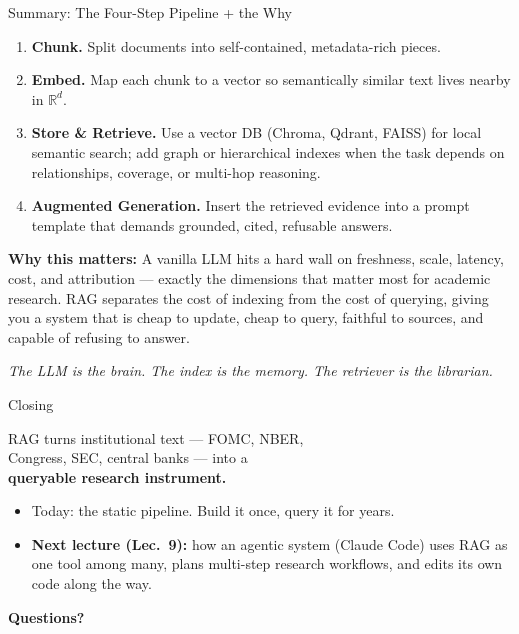 \documentclass[10pt,english,aspectratio=169]{beamer}
\begin{document}
\begin{frame}{Summary: The Four-Step Pipeline + the Why}
\begin{enumerate}
\item \textbf{Chunk.} Split documents into self-contained, metadata-rich pieces.

\medskip
\item \textbf{Embed.} Map each chunk to a vector so semantically similar text lives nearby in $\mathbb{R}^d$.

\medskip
\item \textbf{Store \& Retrieve.} Use a vector DB (Chroma, Qdrant, FAISS) for local semantic search; add graph or hierarchical indexes when the task depends on relationships, coverage, or multi-hop reasoning.

\medskip
\item \textbf{Augmented Generation.} Insert the retrieved evidence into a prompt template that demands grounded, cited, refusable answers.
\end{enumerate}

\bigskip
\textbf{Why this matters:} A vanilla LLM hits a hard wall on freshness, scale, latency, cost, and attribution --- exactly the dimensions that matter most for academic research. RAG separates the cost of indexing from the cost of querying, giving you a system that is cheap to update, cheap to query, faithful to sources, and capable of refusing to answer.

\bigskip
\centering\emph{The LLM is the brain. The index is the memory. The retriever is the librarian.}
\end{frame}

\begin{frame}{Closing}
\begin{center}
\Large
RAG turns institutional text --- FOMC, NBER,\\
Congress, SEC, central banks --- into a\\
\textbf{queryable research instrument.}
\end{center}

\bigskip
\bigskip
\begin{itemize}
\item Today: the static pipeline. Build it once, query it for years.
\medskip
\item \textbf{Next lecture (Lec.\ 9):} how an agentic system (Claude Code) uses RAG as one tool among many, plans multi-step research workflows, and edits its own code along the way.
\end{itemize}

\bigskip
\centering\textbf{Questions?}
\end{frame}
\end{document}
